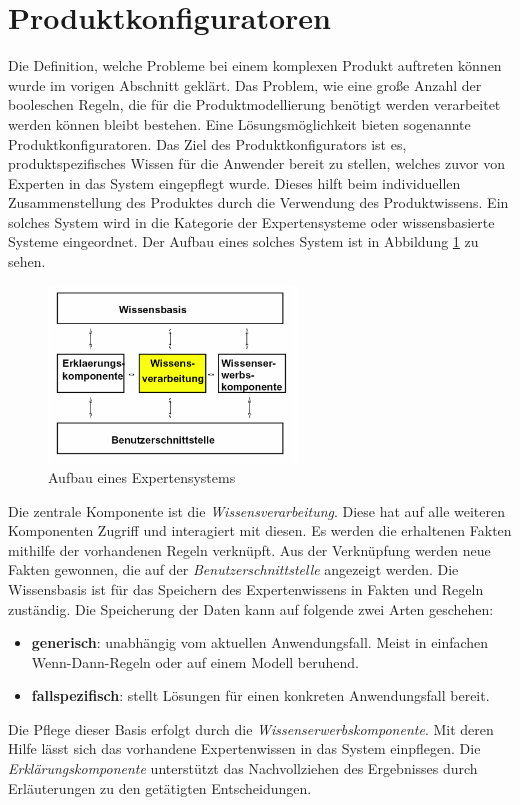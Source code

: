 \section{Produktkonfiguratoren}\label{konfiguratoren}
Die Definition, welche Probleme bei einem komplexen Produkt auftreten können wurde im vorigen Abschnitt geklärt. Das Problem, wie eine große Anzahl der booleschen Regeln, die für die Produktmodellierung benötigt werden verarbeitet werden können bleibt bestehen. Eine Lösungsmöglichkeit bieten sogenannte Produktkonfiguratoren.
Das Ziel des Produktkonfigurators ist es, produktspezifisches Wissen für die Anwender bereit zu stellen, welches zuvor von Experten in das System eingepflegt wurde. Dieses hilft beim individuellen Zusammenstellung des Produktes durch die Verwendung des Produktwissens. Ein solches System wird in die Kategorie der Expertensysteme\cite{bib:puppe} oder wissensbasierte Systeme eingeordnet. Der Aufbau eines solches System ist in Abbildung \ref{expert_system_structure} zu sehen. \par
\begin{figure}
\centering
\includegraphics[width=250px]{images/expertensysteme}
\caption{Aufbau eines Expertensystems \cite[s.6]{bib:keller}}
\label{expert_system_structure}
\end{figure}

Die zentrale Komponente ist die \textit{Wissensverarbeitung}. Diese hat auf alle weiteren Komponenten Zugriff und interagiert mit diesen. Es werden die erhaltenen Fakten mithilfe der vorhandenen Regeln verknüpft. Aus der Verknüpfung werden neue Fakten gewonnen, die auf der \textit{Benutzerschnittstelle} angezeigt werden. Die Wissensbasis ist für das Speichern des Expertenwissens in Fakten und Regeln zuständig. Die Speicherung der Daten kann auf folgende zwei Arten geschehen\cite{bib:expert1}:\par
\begin{itemize}
        \item \textbf{generisch}: unabhängig vom aktuellen Anwendungsfall. Meist in einfachen Wenn-Dann-Regeln oder auf einem Modell beruhend. 
        \item \textbf{fallspezifisch}: stellt Lösungen für einen konkreten Anwendungsfall bereit.
\end{itemize}
 Die Pflege dieser Basis erfolgt durch die \textit{Wissenserwerbskomponente}. Mit deren Hilfe lässt sich das vorhandene Expertenwissen in das System einpflegen. Die \textit{Erklärungskomponente} unterstützt das Nachvollziehen des Ergebnisses durch Erläuterungen zu den getätigten Entscheidungen.


